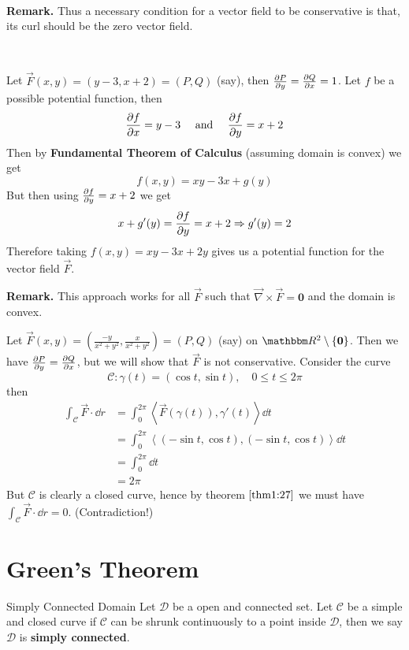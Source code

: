 \documentclass[Analysis-3]{subfiles}
\begin{document}
\ 

\textbf{Remark.} Thus a necessary condition for a vector field to be conservative is that, its curl should be the zero vector field. 

\ 

\begin{Eg}{}{}
    Let $\vec{F}(x,y) = (y-3,x+2) = (P,Q)$ (say), then $\pdv{P}{y} = \pdv{Q}{x} = 1$. Let $f$ be a possible potential function, then 
    \[
        \pdv{f}{x} = y-3 \quad \mbox{ and } \quad \pdv{f}{y} = x+2     
    \] 
    Then by \textbf{Fundamental Theorem of Calculus} (assuming domain is convex) we get 
    \[
        f(x,y) = xy - 3x + g(y)    
    \] 
    But then using $\pdv{f}{y} = x+2$ we get 
    \[
        x + g'(y) = \pdv{f}{y} = x+2 \Rightarrow g'(y) = 2     
    \]
    Therefore taking $f(x,y) = xy - 3x + 2y$ gives us a potential function for the vector field $\vec{F}$. 
\end{Eg}


\textbf{Remark.} This approach works for all $\vec{F}$ such that $\vec{\nabla} \times \vec{F} = \mathbf{0}$ and the domain is convex.   

\begin{Eg}{}{}
    Let $\vec{F}(x,y) = \left( \frac{-y}{x^2+y^2}, \frac{x}{x^2+y^2} \right) = (P,Q)$ (say) on $\R^2 \setminus \{\mathbf{0}\}$. Then we have $\pdv{P}{y} = \pdv{Q}{x}$, but we will show that $\vec{F}$ is not conservative. Consider the curve 
    \[
        \mathcal{C} : \gamma(t) = ( \cos t, \sin t), \quad 0 \leq t \leq 2\pi    
    \]
    then 
    \begin{align*}
        \int_{\mathcal{C}} \vec{F} \cdot \dd r &= \int_0^{2\pi} \left\langle \vec{F}(\gamma(t)),\gamma'(t) \right\rangle \dd t \\ 
        &= \int_0^{2\pi} \left\langle (-\sin t, \cos t), (-\sin t, \cos t) \right\rangle \dd t \\ 
        &= \int_0^{2\pi} \dd t \\ 
        &= 2\pi
    \end{align*}
    But $\mathcal{C}$ is clearly a closed curve, hence by theorem $\ref{thm1:27}$ we must have $\int_{\mathcal{C}} \vec{F} \cdot \dd r = 0$. (Contradiction!)
\end{Eg}

\section{Green's Theorem}

\begin{Def}{Simply Connected Domain}{}
    Let $\mathcal{D}$ be a open and connected set. Let $\mathcal{C}$ be a simple and closed curve if $\mathcal{C}$ can be shrunk continuously to a point inside $\mathcal{D}$, then we say $\mathcal{D}$ is \textbf{simply connected}.
\end{Def}
\end{document}
